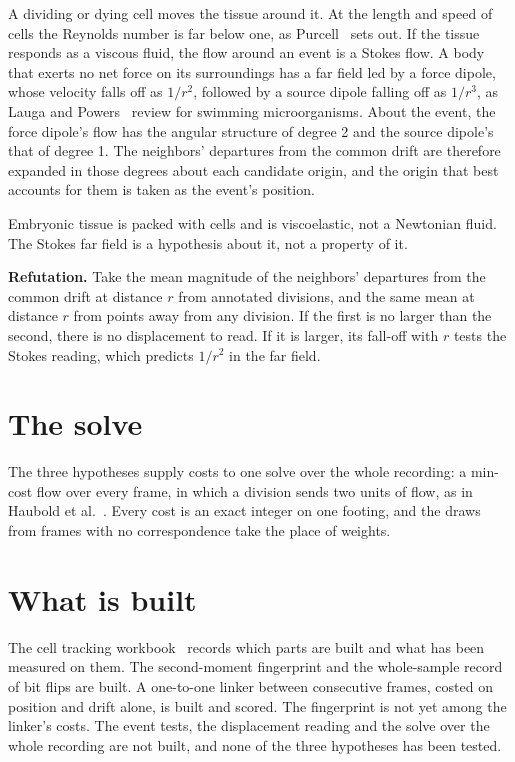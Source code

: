 A dividing or dying cell moves the tissue around it. At the length and speed of cells the Reynolds number is far below one, as Purcell~\cite{src:Purcell-1977} sets out. If the tissue responds as a viscous fluid, the flow around an event is a Stokes flow. A body that exerts no net force on its surroundings has a far field led by a force dipole, whose velocity falls off as \(1/r^2\), followed by a source dipole falling off as \(1/r^3\), as Lauga and Powers~\cite{src:Lauga-Powers-2009} review for swimming microorganisms. About the event, the force dipole's flow has the angular structure of degree 2 and the source dipole's that of degree 1. The neighbors' departures from the common drift are therefore expanded in those degrees about each candidate origin, and the origin that best accounts for them is taken as the event's position.

Embryonic tissue is packed with cells and is viscoelastic, not a Newtonian fluid. The Stokes far field is a hypothesis about it, not a property of it.

\textbf{Refutation.} Take the mean magnitude of the neighbors' departures from the common drift at distance \(r\) from annotated divisions, and the same mean at distance \(r\) from points away from any division. If the first is no larger than the second, there is no displacement to read. If it is larger, its fall-off with \(r\) tests the Stokes reading, which predicts \(1/r^2\) in the far field.

\section{\texorpdfstring{The solve}{The solve}}

The three hypotheses supply costs to one solve over the whole recording: a min-cost flow over every frame, in which a division sends two units of flow, as in Haubold et al.~\cite{src:Haubold-2016}. Every cost is an exact integer on one footing, and the draws from frames with no correspondence take the place of weights.

\section{\texorpdfstring{What is built}{What is built}}

The cell tracking workbook~\cite{src:Quigg-cell-tracking-workbook} records which parts are built and what has been measured on them. The second-moment fingerprint and the whole-sample record of bit flips are built. A one-to-one linker between consecutive frames, costed on position and drift alone, is built and scored. The fingerprint is not yet among the linker's costs. The event tests, the displacement reading and the solve over the whole recording are not built, and none of the three hypotheses has been tested.

